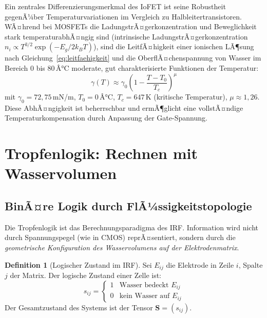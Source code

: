 ﻿\documentclass[a4paper,12pt]{scrreprt}
\theoremstyle{definition}
\newtheorem{definition}{Definition}[section]
\begin{document}
Ein zentrales Differenzierungsmerkmal des IoFET ist seine Robustheit gegenÃ¼ber
Temperaturvariationen im Vergleich zu Halbleitertransistoren. WÃ¤hrend bei MOSFETs
die LadungstrÃ¤gerkonzentration und Beweglichkeit stark temperaturabhÃ¤ngig sind
(intrinsische LadungstrÃ¤gerkonzentration $n_i \propto T^{3/2} \exp(-E_g/2k_BT)$),
sind die LeitfÃ¤higkeit einer ionischen LÃ¶sung nach Gleichung~\eqref{eq:leitfaehigkeit}
und die OberflÃ¤chenspannung von Wasser im Bereich 0 bis 80\,Â°C moderate,
gut charakterisierte Funktionen der Temperatur:
\begin{equation}
	\gamma(T) \approx \gamma_0 \left(1 - \frac{T - T_0}{T_c}\right)^{\mu}
	\label{eq:oberflaechenspannung_temp}
\end{equation}
mit $\gamma_0 = 72{,}75$\,mN/m, $T_0 = 0$\,Â°C, $T_c = 647$\,K (kritische
Temperatur), $\mu \approx 1{,}26$. Diese AbhÃ¤ngigkeit ist beherrschbar und
ermÃ¶glicht eine vollstÃ¤ndige Temperaturkompensation durch Anpassung der
Gate-Spannung.

\section{Tropfenlogik: Rechnen mit Wasservolumen}

\subsection{BinÃ¤re Logik durch FlÃ¼ssigkeitstopologie}

Die Tropfenlogik ist das Berechnungsparadigma des IRF. Information wird nicht
durch Spannungspegel (wie in CMOS) reprÃ¤sentiert, sondern durch die
\emph{geometrische Konfiguration des Wasservolumens auf der Elektrodenmatrix}.

\begin{definition}[Logischer Zustand im IRF]
	Sei $E_{ij}$ die Elektrode in Zeile $i$, Spalte $j$ der Matrix. Der
	logische Zustand einer Zelle ist:
	\begin{equation}
		s_{ij} = \begin{cases} 1 & \text{Wasser bedeckt } E_{ij} \\
			0 & \text{kein Wasser auf } E_{ij} \end{cases}
		\label{eq:logischer_zustand}
	\end{equation}
	Der Gesamtzustand des Systems ist der Tensor $\mathbf{S} = (s_{ij})$.
\end{definition}
\end{document}
